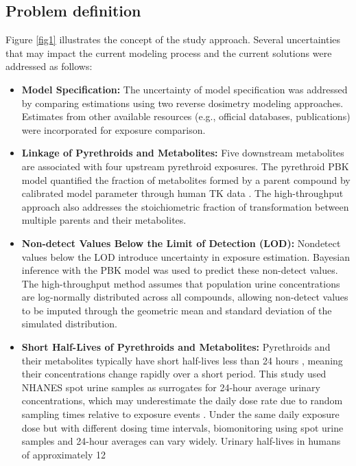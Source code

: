 \documentclass[toxics,article,submit,pdftex,moreauthors]{Definitions/mdpi}
\begin{document}
\subsection{Problem definition}\label{problem-definition}

Figure \ref{fig1} illustrates the concept of the study approach. Several
uncertainties that may impact the current modeling process and the
current solutions were addressed as follows:

\begin{itemize}
\item
  \textbf{Model Specification:} The uncertainty of model specification
  was addressed by comparing estimations using two reverse dosimetry
  modeling approaches. Estimates from other available resources (e.g.,
  official databases, publications) were incorporated for exposure
  comparison.
\item
  \textbf{Linkage of Pyrethroids and Metabolites:} Five downstream
  metabolites are associated with four upstream pyrethroid exposures.
  The pyrethroid PBK model quantified the fraction of metabolites formed
  by a parent compound by calibrated model parameter through human TK
  data \citep{quindroit2019estimating}. The high-throughput approach
  also addresses the stoichiometric fraction of transformation between
  multiple parents and their metabolites.
\item
  \textbf{Non-detect Values Below the Limit of Detection (LOD):}
  Nondetect values below the LOD introduce uncertainty in exposure
  estimation. Bayesian inference with the PBK model was used to predict
  these non-detect values. The high-throughput method assumes that
  population urine concentrations are log-normally distributed across
  all compounds, allowing non-detect values to be imputed through the
  geometric mean and standard deviation of the simulated distribution.
\item
  \textbf{Short Half-Lives of Pyrethroids and Metabolites:} Pyrethroids
  and their metabolites typically have short half-lives less than 24
  hours \citep{hays2007biomonitoring}, meaning their concentrations
  change rapidly over a short period. This study used NHANES spot urine
  samples as surrogates for 24-hour average urinary concentrations,
  which may underestimate the daily dose rate due to random sampling
  times relative to exposure events \citep{aylward_interpreting_2012}.
  Under the same daily exposure dose but with different dosing time
  intervals, biomonitoring using spot urine samples and 24-hour averages
  can vary widely. Urinary half-lives in humans of approximately 12

\end{itemize}
\end{document}
